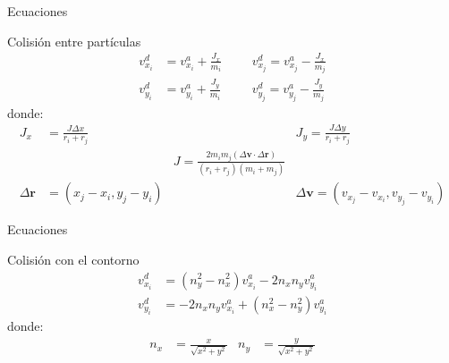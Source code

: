 \begin{frame}{Ecuaciones}
    \begin{block}{Colisión entre partículas}
        \begin{equation*}
            \begin{aligned}
                v_{x_i}^{d} &= v_{x_i}^{a} + \frac{J_x}{m_i} &&&
                v_{x_j}^{d} = v_{x_j}^{a} - \frac{J_x}{m_j} \\
                v_{y_i}^{d} &= v_{y_i}^{a} + \frac{J_y}{m_i} &&&
                v_{y_j}^{d} = v_{y_j}^{a} - \frac{J_y}{m_j}
            \end{aligned}\label{eq:equation-particles-collision}
        \end{equation*}
        donde:
        \begin{equation*}
            \begin{aligned}
                J_x &= \frac{J\Delta{x}}{r_i+r_j} &&
                J_y = \frac{J\Delta{y}}{r_i+r_j} \\&&
                J = \frac{2 m_i m_j (\Delta{\mathbf{v}} \cdot \Delta{\mathbf{r}})}{(r_i+r_j)(m_i+m_j)} \\
                \Delta{\mathbf{r}} &= (x_j - x_i, y_j - y_i) &&
                \Delta{\mathbf{v}} = (v_{x_j} - v_{x_i}, v_{y_j} - v_{y_i})
            \end{aligned}\label{eq:equation-particles-collision-variables}
        \end{equation*}
    \end{block}

\end{frame}

\begin{frame}{Ecuaciones}

    \begin{block}{Colisión con el contorno}
        \begin{equation*}
            \begin{aligned}
                v_{x_i}^{d} &= (n_y^2 - n_x^2) v_{x_i}^{a} - 2 n_x n_y v_{y_i}^{a} \\
                v_{y_i}^{d} &= -2 n_x n_y v_{x_i}^{a} + (n_x^2 - n_y^2) v_{y_i}^{a}
            \end{aligned}\label{eq:equation-particles-collision-wall}
        \end{equation*}
        donde:
        \begin{equation*}
            \begin{aligned}
                n_x &= \frac{x}{\sqrt{x^2 + y^2}} &
                n_y &= \frac{y}{\sqrt{x^2 + y^2}}
            \end{aligned}\label{eq:equation-particles-collision-wall-variables}
        \end{equation*}
    \end{block}
\end{frame}

